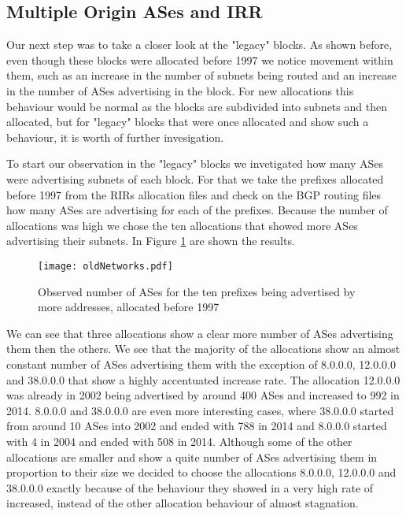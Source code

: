 \documentclass[11pt,a4paper]{scrreprt}
\begin{document}
\clearpage
\subsection{Multiple Origin ASes and IRR}

Our next step was to take a closer look at the "legacy" blocks. As shown before, even though these blocks were allocated before 1997 we notice movement within them, such as an increase in the number of subnets being routed and an increase in the number of ASes advertising in the block. For new allocations this behaviour would be normal as the blocks are subdivided into subnets and then allocated, but for "legacy" blocks that were once allocated and show such a behaviour, it is worth of further invesigation. 

To start our observation in the "legacy" blocks we invetigated how many ASes were advertising subnets of each block. For that we take the prefixes allocated before 1997 from the RIRs allocation files and check on the BGP routing files how many ASes are advertising for each of the prefixes. Because the number of allocations was high we chose the ten allocations that showed more ASes advertising their subnets. In Figure \ref{fig:oldNetworks} are shown the results.

\begin{figure}[!h]
\centering
\texttt{[image: oldNetworks.pdf]}
\caption{Observed number of ASes for the ten prefixes being advertised by more addresses, allocated before 1997}
\label{fig:oldNetworks}
\end{figure}

We can see that three allocations show a clear more number of ASes advertising them then the others. We see that the majority of the allocations show an almost constant number of ASes advertising them with the exception of 8.0.0.0, 12.0.0.0 and 38.0.0.0 that show a highly accentuated increase rate. The allocation 12.0.0.0 was already in 2002 being advertised by around 400 ASes and increased to 992 in 2014. 8.0.0.0 and 38.0.0.0 are even more interesting cases, where 38.0.0.0 started from around 10 ASes into 2002 and ended with 788 in 2014 and 8.0.0.0 started with 4 in 2004 and ended with 508 in 2014. 
Although some of the other allocations are smaller and show a quite number of ASes advertising them in proportion to their size we decided to choose the allocations 8.0.0.0, 12.0.0.0 and 38.0.0.0 exactly because of the behaviour they showed in a very high rate of increased, instead of the other allocation behaviour of almost stagnation.
\end{document}
